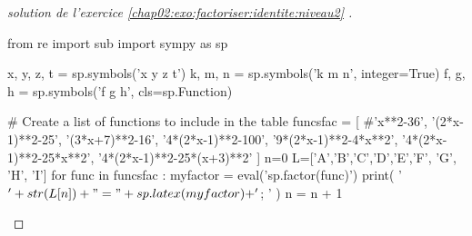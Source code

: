 \documentclass[main.tex]{subfiles}
\begin{document}
\begin{proof}[solution de l'exercice \ref{chap02:exo:factoriser:identite:niveau2} ]  \scriptsize
	\begin{pycode}
from re import sub
import sympy as sp

x, y, z, t = sp.symbols('x y z t')
k, m, n = sp.symbols('k m n', integer=True)
f, g, h = sp.symbols('f g h', cls=sp.Function)

# Create a list of functions to include in the table
funcsfac = [
#'x**2-36',
'(2*x-1)**2-25',
'(3*x+7)**2-16',
'4*(2*x-1)**2-100',
'9*(2*x-1)**2-4*x**2',
'4*(2*x-1)**2-25*x**2',
'4*(2*x-1)**2-25*(x+3)**2'
]
n=0
L=['A','B','C','D','E','F', 'G', 'H', 'I']
for func in funcsfac :
	myfactor =  eval('sp.factor(func)')
	print( '$'+ str(L[n])  + "=" + sp.latex(myfactor) + '$; ' )
	n     = n + 1
	\end{pycode}
\end{proof}


 
%	 
\cleardoublepage 
%	
\end{document}
